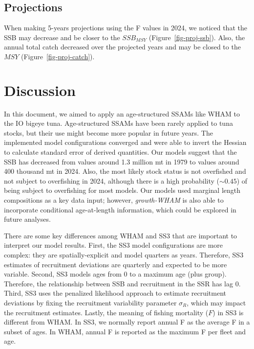 \documentclass[
]{scrartcl}
\begin{document}
\subsection{Projections}\label{projections-1}

When making 5-years projections using the F values in 2024, we noticed
that the SSB may decrease and be closer to the \(SSB_{MSY}\)
(Figure~\ref{fig-proj-ssb}). Also, the annual total catch decreased over
the projected years and may be closed to the \(MSY\)
(Figure~\ref{fig-proj-catch}).

\section{Discussion}\label{discussion}

In this document, we aimed to apply an age-structured SSAMs like WHAM to
the IO bigeye tuna. Age-structured SSAMs have been rarely applied to
tuna stocks, but their use might become more popular in future years.
The implemented model configurations converged and were able to invert
the Hessian to calculate standard error of derived quantities. Our
models suggest that the SSB has decreased from values around 1.3 million
mt in 1979 to values around 400 thousand mt in 2024. Also, the most
likely stock status is not overfished and not subject to overfishing in
2024, although there is a high probability (\(\sim 0.45\)) of being
subject to overfishing for most models. Our models used marginal length
compositions as a key data input; however, \emph{growth-WHAM} is also
able to incorporate conditional age-at-length information, which could
be explored in future analyses.

There are some key differences among WHAM and SS3 that are important to
interpret our model results. First, the SS3 model configurations are
more complex: they are spatially-explicit and model quarters as years.
Therefore, SS3 estimates of recruitment deviations are quarterly and
expected to be more variable. Second, SS3 models ages from 0 to a
maximum age (plus group). Therefore, the relationship between SSB and
recruitment in the SSR has lag 0. Third, SS3 uses the penalized
likelihood approach to estimate recruitment deviations by fixing the
recruitment variability parameter \(\sigma_R\), which may impact the
recruitment estimates. Lastly, the meaning of fishing mortality (\(F\))
in SS3 is different from WHAM. In SS3, we normally report annual F as
the average F in a subset of ages. In WHAM, annual F is reported as the
maximum F per fleet and age.
\end{document}
